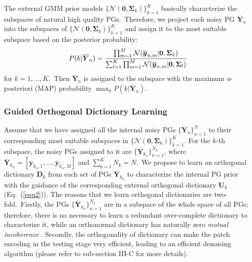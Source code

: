 The external GMM prior models $\{\mathcal{N}(\bm{0},\bm{\Sigma}_{k})\}_{k=1}^{K}$ basically characterize the subspaces of natural high quality PGs.\ Therefore, we project each noisy PG $\bm{\overline{Y}}_{n}$ into the subspaces of $\{\mathcal{N}(\bm{0},\bm{\Sigma}_{k})\}_{k=1}^{K}$ and assign it to the most suitable subspace based on the posterior probability:
\vspace{-2mm}
\begin{equation}\label{equ3}
\vspace{-2mm}
P(k|\bm{\overline{Y}}_{n})=\frac{\prod_{m=1}^{M}\mathcal{N}(\bm{\overline{y}}_{n,m}|\bm{0},\bm{\Sigma}_{k})}{\sum_{l=1}^{K}\prod_{m=1}^{M}\mathcal{N}(\bm{\overline{y}}_{n,m}|\bm{0},\bm{\Sigma}_{l})}
\end{equation}
for $k=1,...,K$.\ Then $\bm{\overline{Y}}_{n}$ is assigned to the subspace with the maximum \emph{a}-posteriori (MAP) probability $\max_{k}P(k|\bm{\overline{Y}}_{n})$.


\subsubsection{Guided Orthogonal Dictionary Learning}

Assume that we have assigned all the internal noisy PGs $\{\bm{\overline{Y}}_{n}\}_{n=1}^{N}$ to their corresponding most suitable subspaces in $\{\mathcal{N}(\bm{0},\bm{\Sigma}_{k})\}_{k=1}^{K}$. For the $k$-th subspace, the noisy PGs assigned to it are $\{\bm{\overline{Y}}_{k_{n}}\}_{n=1}^{N_{k}}$, where $\bm{\overline{Y}}_{k_{n}}=[\bm{\overline{y}}_{k_{n},1},...,\bm{\overline{y}}_{k_{n},M}]$ and $\sum_{k=1}^{K}N_{k}=N$.\ We propose to learn an orthogonal dictionary $\bm{D}_{k}$ from each set of PGs $\bm{\overline{Y}}_{k_{n}}$ to characterize the internal PG prior with the guidance of the corresponding external orthogonal dictionary $\bm{U}_{k}$ (Eq.\ (\ref{equ2})). The reasons that we learn orthogonal dictionaries are two-fold.\ Firstly, the PGs $\{\bm{\overline{Y}}_{k_{n}}\}_{n=1}^{N_{k}}$ are in a subspace of the whole space of all PGs; therefore, there is no necessary to learn a redundant over-complete dictionary to characterize it, while an orthonormal dictionary has naturally zero \emph{mutual incoherence} \cite{donoho2001uncertainty}. Secondly, the orthogonality of dictionary can make the patch encoding in the testing stage very efficient, leading to an efficient denoising algorithm (please refer to sub-section III-C for more details).

